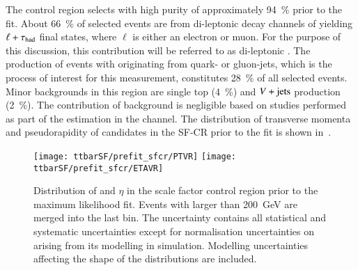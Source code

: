 
The control region selects \ttbar with high purity of approximately
\SI{94}{\percent} prior to the fit. About \SI{66}{\percent} of
selected events are from di-leptonic decay channels of \ttbar yielding
$\ell + \tau_{\text{had}}$ final states, where $\ell$ is either an electron or
muon. For the purpose of this discussion, this contribution will be
referred to as di-leptonic \ttbar. The production of \ttbar events
with \tauhadvis originating from quark- or gluon-jets, which is the
process of interest for this measurement, constitutes
\SI{28}{\percent} of all selected events. Minor backgrounds in this
region are single top (\SI{4}{\percent}) and $V+\text{jets}$ production
(\SI{2}{\percent}). The contribution of \multijet background is
negligible based on studies performed as part of the \faketauhadvis
estimation in the \lephad channel. The distribution of transverse
momenta and pseudorapidity of \tauhadvis candidates in the SF-CR prior
to the fit is shown in~.

\begin{figure}[htbp]
  \centering

  \texttt{[image: ttbarSF/prefit\_sfcr/PTVR]}%
  \texttt{[image: ttbarSF/prefit\_sfcr/ETAVR]}

  \caption{Distribution of \tauhadvis \pT and $\eta$ in the scale
    factor control region prior to the maximum likelihood fit. Events
    with \tauhadvis \pT larger than \SI{200}{\GeV} are merged into the
    last bin. The uncertainty contains all statistical and systematic
    uncertainties except for normalisation uncertainties on \ttbar
    arising from its modelling in simulation. Modelling uncertainties
    affecting the shape of the distributions are included.}%
  \label{fig:ttbarSF_prefit_pt}
\end{figure}

